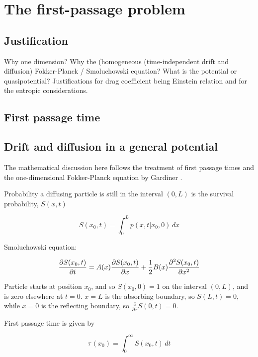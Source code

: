 \chapter{The first-passage problem}
\label{first_passage}

\section{Justification}

Why one dimension?  Why the (homogeneous (time-independent drift and diffusion) Fokker-Planck / Smoluchowski equation?  What is the potential or quasipotential?  Justifications for drag coefficient being Einstein relation and for the entropic considerations.

\section{First passage time}


\section{Drift and diffusion in a general potential}

The mathematical discussion here follows the treatment of first passage times and the one-dimensional Fokker-Planck equation by Gardiner \citep{Gardiner1985}.

Probability a diffusing particle is still in the interval $(0,L)$ is the survival probability, $S(x,t)$

\begin{equation}
S(x_0,t) = \int_{0}^{L} p(x,t \lvert x_0,0) \,dx
\label{eqn:survival}
\end{equation}

Smoluchowski equation:

\begin{equation}
\frac{\partial S(x_0,t)}{\partial t} = A(x) \frac{\partial S(x_0,t)}{\partial x} + \frac{1}{2} B(x) \frac{\partial^2 S(x_0,t)}{\partial x^2}
\label{eqn:smoluchowski}
\end{equation}

Particle starts at position $x_0$, and so $S(x_0,0) = 1$ on the interval $(0,L)$, and is zero elsewhere at $t=0$.  $x=L$ is the absorbing boundary, so $S(L,t)=0$, while $x=0$ is the reflecting boundary, so $\frac{\partial}{\partial x} S(0,t)=0$.

First passage time is given by

\begin{equation}
\tau \, (x_0) = \int_{0}^{\infty} S(x_0,t) \,dt
\label{eqn:first_passage}
\end{equation}

